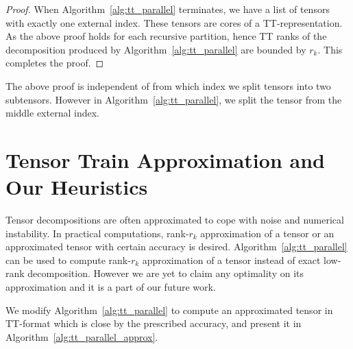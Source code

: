 \documentclass[runningheads]{llncs}
\begin{document}
\begin{proof}
	When Algorithm~\ref{alg:tt_parallel} terminates, we have a list of tensors with exactly one external index. These tensors are cores of a TT-representation. As the above proof holds for each recursive partition, hence TT ranks of the decomposition produced by Algorithm~\ref{alg:tt_parallel} are bounded by $r_k$. This completes the proof.
\end{proof}

\indent The above proof is independent of from which index we split tensors into two subtensors. However in Algorithm~\ref{alg:tt_parallel}, we split the tensor from the middle external index.


\section{Tensor Train Approximation and Our Heuristics}
\label{sec:heuristics}


Tensor decompositions are often approximated to cope with noise and numerical instability. In practical computations, rank-$r_k$ approximation of a tensor or an approximated tensor with certain accuracy  is desired. Algorithm~\ref{alg:tt_parallel} can be used to compute rank-$r_k$ approximation of a tensor instead of exact low-rank decomposition. However we are yet to claim any optimality on its approximation and it is a part of our future work.

We modify Algorithm~\ref{alg:tt_parallel} to compute an approximated tensor in TT-format which is close by the prescribed accuracy, and present it in Algorithm~\ref{alg:tt_parallel_approx}.
 
\end{document}
